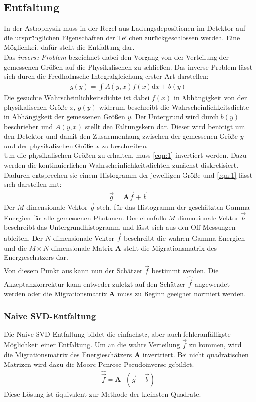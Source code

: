 \subsection{Entfaltung}
In der Astrophysik muss in der Regel aus Ladungsdepositionen im Detektor auf die ursprünglichen Eigenschaften der Teilchen zurückgeschlossen werden. Eine Möglichkeit dafür stellt die Entfaltung dar.\\
Das \textit{inverse Problem} bezeichnet dabei den Vorgang von der Verteilung der gemessenen Größen auf die Physikalischen zu schließen. Das inverse Problem lässt sich durch die Fredholmsche-Integralgleichung erster Art darstellen:
\begin{align}
	g(y)=\int A(y,x)f(x)\text{d}x + b(y)
	\label{eqn:1}
\end{align}
Die gesuchte Wahrscheinlichkeitsdichte ist dabei $f(x)$ in Abhängigkeit von der physikalischen Größe $x$, $g(y)$ widerum beschreibt die Wahrscheinlichkeitsdichte in Abhängigkeit der gemessenen Größen $y$. Der Untergrund wird durch $b(y)$ beschrieben und $A(y,x)$ stellt den Faltungskern dar. Dieser wird benötigt um den Detektor und damit den Zusammenhang zwischen der gemessenen Größe $y$ und der physikalischen Größe $x$ zu beschreiben. \\
Um die physikalischen Größen zu erhalten, muss \eqref{eqn:1} invertiert werden. Dazu werden die kontinuierlichen Wahrscheinlichkeitsdichten zunächst diskretisiert. Dadurch entsprechen sie einem Histogramm der jeweiligen Größe und \eqref{eqn:1} lässt sich darstellen mit:
\begin{align}
	\vec{g} = \pmb{A}\vec{f} + \vec{b}
\end{align}
Der $M$-dimensionale Vektor $\vec{g}$ steht für das Histogramm der geschätzten Gamma-Energien für alle gemessenen Photonen. Der ebenfalls $M$-dimensionale Vektor $\vec{b}$ beschreibt das Untergrundhistogramm und lässt sich aus den Off-Messungen ableiten. Der $N$-dimensionale Vektor $\vec{f}$ beschreibt die wahren Gamma-Energien und die $M\times N$-dimensionale Matrix $\pmb{A}$ stellt die Migrationsmatrix des Energieschätzers dar. \\
Von diesem Punkt aus kann nun der Schätzer $\hat{\vec{f}}$ bestimmt werden. Die Akzeptanzkorrektur kann entweder zuletzt auf den Schätzer $\hat{\vec{f}}$ angewendet werden oder die Migrationsmatrix $\pmb{A}$ muss zu Beginn geeignet normiert werden.
\subsubsection{Naive SVD-Entfaltung}
Die Naive SVD-Entfaltung bildet die einfachste, aber auch fehleranfälligste Möglichkeit einer Entfaltung. Um an die wahre Verteilung $\vec{f}$ zu kommen, wird die Migrationsmatrix des Energieschätzers $\pmb{A}$ invertriert. Bei nicht quadratischen Matrizen wird dazu die Moore-Penrose-Pseudoinverse gebildet.\\
\begin{align}
	\hat{\vec{f}} = \pmb{A}^{+}(\vec{g} - \vec{b})
	\label{eqn:NSVD}
\end{align}
Diese Lösung ist äquivalent zur Methode der kleinsten Quadrate.

